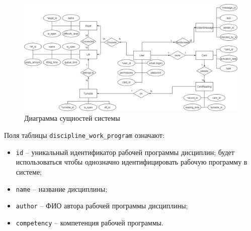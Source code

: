 \clearpage
\begin{figure}[h!]
	\begin{center}
		\includegraphics[scale=0.4]{../imgs/er/er.png}
	\end{center}
	\captionsetup{justification=centering}
	\caption{Диаграмма сущностей системы}
	\label{img:er}
\end{figure}









































Поля таблицы \texttt{discipline\_work\_program} означают:

\begin{itemize}
	\item \texttt{id} -- уникальный идентификатор рабочей программы дисциплин; будет использоваться чтобы однозначно идентифицировать рабочую программу в системе;
	\item \texttt{name} -- название дисциплины;
	\item \texttt{author} -- ФИО автора рабочей программы дисциплины; 
	\item \texttt{competency} -- компетенция рабочей программы.
\end{itemize}


